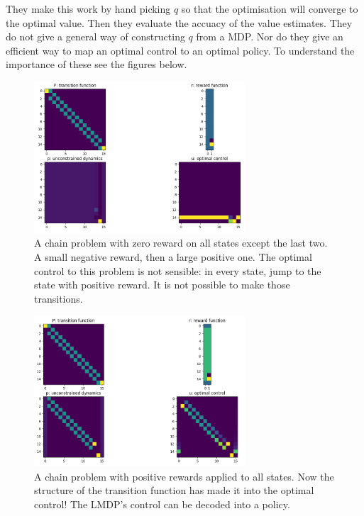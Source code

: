 They make this work by hand picking $q$ so that the optimisation will converge to the optimal value.
Then they evaluate the accuacy of the value estimates.
They do not give a general way of constructing $q$ from a MDP.
Nor do they give an efficient way to map an optimal control to an optimal policy.
To understand the importance of these see the figures below.

\begin{figure}
\centering
\includegraphics[width=0.7\textwidth,height=0.35\textheight]{../../pictures/figures/chain-test-zero-rewards.png}
\caption{A chain problem with zero reward on all states except the last two. A small negative reward, then a large positive one.
The optimal control to this problem is not sensible: in every state, jump to the state with positive reward.
It is not possible to make those transitions.}
\end{figure}

\begin{figure}
\centering
\includegraphics[width=0.7\textwidth,height=0.35\textheight]{../../pictures/figures/chain-test-pos-rewards.png}
\caption{A chain problem with positive rewards applied to all states.
Now the structure of the transition function has made it into the optimal control!
The LMDP's control can be decoded into a policy.}
\end{figure}

